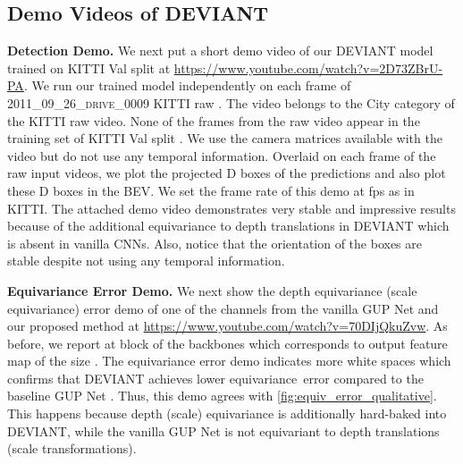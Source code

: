 \documentclass[runningheads]{llncs}
\newcommand{\threeD}{D}
\newcommand{\equivariant} {equivariant}
\newcommand{\equivariance}{equivariance}
\newcommand{\Equivariance}{Equivariance}
\newcommand{\scaleEquivariance}{scale \equivariance}
\newcommand{\depthEquivariance} {depth \equivariance}
\newcommand{\transformation}{transformation}
\newcommand{\kitti}{KITTI}
\newcommand{\valOne}{Val}
\newcommand{\gupNet}{GUP Net}
\newcommand{\noIndentHeading}[1]{\noindent\textbf{#1}}
\newcommand{\methodName}{DEVIANT}
\begin{document}
    
\subsection{Demo Videos of \methodName}   
        
\noIndentHeading{Detection Demo. }
            We next put a short demo video of our \methodName{} model trained on \kitti{} \valOne{} split at \url{https://www.youtube.com/watch?v=2D73ZBrU-PA}. 
            We run our trained model independently on each frame of \textsc{2011\_09\_26\_drive\_0009} \kitti{} raw \cite{geiger2013vision}.
            The video belongs to the City category of the \kitti{} raw video.
            None of the frames from the raw video appear in the training set of \kitti{} \valOne{} split \cite{kumar2021groomed}.
            We use the camera matrices available with the video but do not use any temporal information. 
            Overlaid on each frame of the raw input videos, we plot the projected \threeD{} boxes of the predictions and also plot these \threeD{} boxes in the BEV.
            We set the frame rate of this demo at 
            fps as in \kitti{}.
            The attached demo video demonstrates very stable and impressive results because of the additional equivariance to depth translations in \methodName{} which is absent in vanilla CNNs.
            Also, notice that the orientation of the boxes are stable despite not using any temporal information. 
            
\noIndentHeading{\Equivariance{} Error Demo.}
            We next show the \depthEquivariance{} (\scaleEquivariance{}) error demo of one of the channels from the vanilla \gupNet{} and our proposed method at \url{https://www.youtube.com/watch?v=70DIjQkuZvw}.
            As before, we report at block  of the backbones which corresponds to output feature map of the size .
            The \equivariance{} error demo indicates more white spaces which confirms that \methodName{} achieves lower equivariance~error compared to the baseline \gupNet{} \cite{lu2021geometry}. 
            Thus, this demo agrees with \cref{fig:equiv_error_qualitative}. 
            This happens because depth (scale) \equivariance{} is additionally hard-baked into \methodName, while the vanilla \gupNet{} is not \equivariant{} to depth translations (scale \transformation s).
\end{document}
